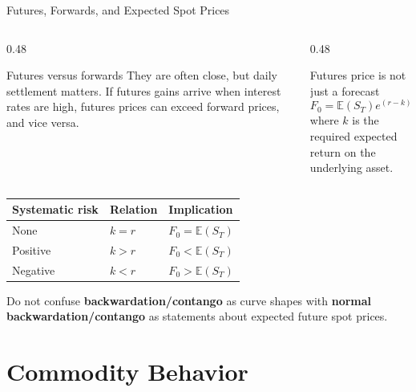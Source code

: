 \documentclass[aspectratio=169,11pt]{beamer}
\newcommand{\E}{\mathbb{E}}
\begin{document}
\begin{frame}{Futures, Forwards, and Expected Spot Prices}
    \small
    \begin{columns}[T]
        \begin{column}{0.48\textwidth}
            \begin{block}{Futures versus forwards}
                They are often close, but daily settlement matters.
                If futures gains arrive when interest rates are high, futures prices can exceed forward prices, and vice versa.
            \end{block}
        \end{column}
        \begin{column}{0.48\textwidth}
            \begin{block}{Futures price is not just a forecast}
                \[
                    F_0=\E(S_T)e^{(r-k)T}
                \]
                where $k$ is the required expected return on the underlying asset.
            \end{block}
        \end{column}
    \end{columns}

    \vspace{0.5em}
    \centering
    \begin{tabular}{@{}lll@{}}
        \toprule
        Systematic risk & Relation & Implication \\
        \midrule
        None & $k=r$ & $F_0=\E(S_T)$ \\
        Positive & $k>r$ & $F_0<\E(S_T)$ \\
        Negative & $k<r$ & $F_0>\E(S_T)$ \\
        \bottomrule
    \end{tabular}

    \vspace{0.5em}
    Do not confuse \textbf{backwardation/contango} as curve shapes with \textbf{normal backwardation/contango} as statements about expected future spot prices.
\end{frame}

\section{Commodity Behavior}
\end{document}
